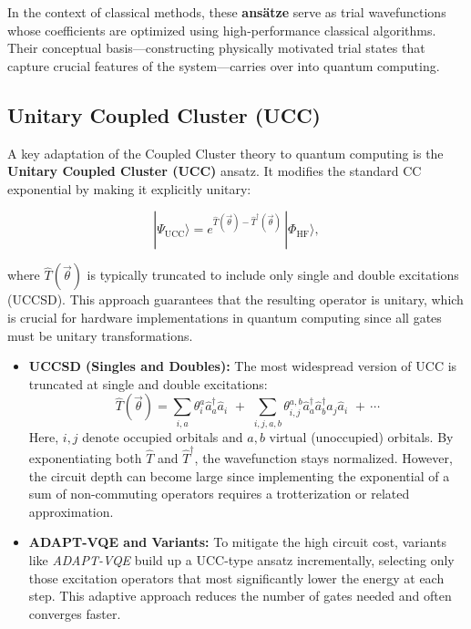 In the context of classical methods, these \textbf{ans\"{a}tze} serve as trial wavefunctions whose coefficients are optimized using high-performance classical algorithms. Their conceptual basis---constructing physically motivated trial states that capture crucial features of the system---carries over into quantum computing.

\subsection{Unitary Coupled Cluster (UCC)}
A key adaptation of the Coupled Cluster theory to quantum computing is the \textbf{Unitary Coupled Cluster (UCC)} ansatz. It modifies the standard CC exponential by making it explicitly unitary:

\[
|\Psi_{\mathrm{UCC}}\rangle 
= e^{\hat{T}(\vec{\theta}) - \hat{T}^\dagger(\vec{\theta})} \,|\Phi_{\mathrm{HF}}\rangle,
\]

where $\hat{T}(\vec{\theta})$ is typically truncated to include only single and double excitations (UCCSD). This approach guarantees that the resulting operator is unitary, which is crucial for hardware implementations in quantum computing since all gates must be unitary transformations. 

\begin{itemize}
    \item \textbf{UCCSD (Singles and Doubles):} The most widespread version of UCC is truncated at single and double excitations:
    \[
        \hat{T}(\vec{\theta}) = \sum_{i,a} \theta_{i}^{a} \hat{a}_a^\dagger \hat{a}_i 
          \,\,+\,\, 
          \sum_{i,j,a,b} \theta_{i,j}^{a,b} \hat{a}_a^\dagger \hat{a}_b^\dagger \hat{a}_j \hat{a}_i
          \,\,+\, \cdots
    \]
    Here, $i, j$ denote occupied orbitals and $a, b$ virtual (unoccupied) orbitals. By exponentiating both $\hat{T}$ and $\hat{T}^\dagger$, the wavefunction stays normalized. However, the circuit depth can become large since implementing the exponential of a sum of non-commuting operators requires a trotterization or related approximation.

    \item \textbf{ADAPT-VQE and Variants:} To mitigate the high circuit cost, variants like \textit{ADAPT-VQE} build up a UCC-type ansatz incrementally, selecting only those excitation operators that most significantly lower the energy at each step. This adaptive approach reduces the number of gates needed and often converges faster.
\end{itemize}

